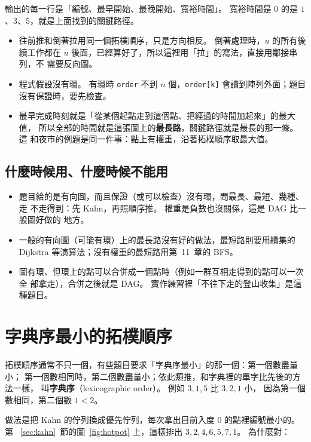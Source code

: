 輸出的每一行是「編號、最早開始、最晚開始、寬裕時間」。 寬裕時間是 $0$ 的是
$1$、$3$、$5$，就是上面找到的關鍵路徑。

\begin{itemize}
\item 往前推和倒著拉用同一個拓樸順序，只是方向相反。 倒著處理時，$u$ 的所有後
續工作都在 $u$ 後面，已經算好了，所以這裡用「拉」的寫法，直接用鄰接串列，不
需要反向圖。
\item 程式假設沒有環。 有環時 \texttt{order} 不到 $n$ 個，\texttt{order[k]}
會讀到陣列外面；題目沒有保證時，要先檢查。
\item 最早完成時刻就是「從某個起點走到這個點、把經過的時間加起來」的最大值，
所以全部的時間就是這張圖上的\textbf{最長路}，關鍵路徑就是最長的那一條。 這
和夜市的例題是同一件事：點上有權重，沿著拓樸順序取最大值。
\end{itemize}

\subsection{什麼時候用、什麼時候不能用}

\begin{itemize}
\item 題目給的是有向圖，而且保證（或可以檢查）沒有環，問最長、最短、幾種、走
不走得到：先 Kahn，再照順序推。 權重是負數也沒關係，這是 DAG 比一般圖好做的
地方。
\item 一般的有向圖（可能有環）上的最長路沒有好的做法，最短路則要用續集的
Dijkstra 等演算法；沒有權重的最短路用第~11~章的 BFS。
\item 圖有環、但環上的點可以合併成一個點時（例如一群互相走得到的點可以一次全
部拿走），合併之後就是 DAG。 實作練習裡「不往下走的登山收集」是這種題目。
\end{itemize}

\section{字典序最小的拓樸順序}
\label{sec:lex-topo}

拓樸順序通常不只一個，有些題目要求「字典序最小」的那一個：第一個數盡量小；
第一個數相同時，第二個數盡量小；依此類推，和字典裡的單字比先後的方法一樣，
叫\textbf{字典序}（lexicographic order）。 例如 $3, 1, 5$ 比 $3, 2, 1$ 小，
因為第一個數相同，第二個數 $1 < 2$。

做法是把 Kahn 的佇列換成優先佇列，每次拿出目前入度 $0$ 的點裡編號最小的。 第
~\ref{sec:kahn}~節的圖~\ref{fig:hotpot} 上，這樣排出 $3, 2, 4, 6, 5, 7, 1$。
為什麼對：

